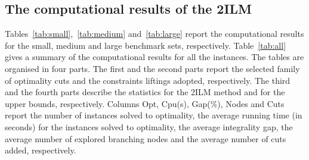 \documentclass[11pt]{article}
\theoremstyle{definition}
\begin{document}
\subsection{The computational results of the 2ILM}
\label{results}

Tables~\ref{tab:small},~\ref{tab:medium} and~\ref{tab:large} report the computational results for the small, medium and large benchmark sets, respectively. Table~\ref{tab:all} gives a summary of the computational results for all the instances. The tables are organised in four parts. The first and the second parts report the selected family of optimality cuts and the constraints liftings adopted, respectively. The third and the fourth parts describe the statistics for the 2ILM method and for the upper bounds, respectively. Columns Opt, Cpu(s), Gap(\%), Nodes and Cuts report the number of instances solved to optimality, the average running time (in seconds) for the instances solved to optimality, the average integrality gap, the average number of explored branching nodes and the average number of cuts added, respectively.
\end{document}
